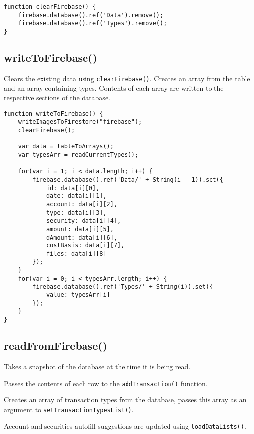 \documentclass[letterpaper]{article}
\begin{document}
\begin{lstlisting}[firstnumber=1]
function clearFirebase() {
    firebase.database().ref('Data').remove();
    firebase.database().ref('Types').remove();
}
\end{lstlisting}

\subsection{writeToFirebase()}

Clears the existing data using \lstinline{clearFirebase()}.
Creates an array from the table and an array containing types.
Contents of each array are written to the respective sections of the database.

\begin{lstlisting}[firstnumber=6]
function writeToFirebase() {
    writeImagesToFirestore("firebase");
    clearFirebase();

    var data = tableToArrays();
    var typesArr = readCurrentTypes();

    for(var i = 1; i < data.length; i++) {
        firebase.database().ref('Data/' + String(i - 1)).set({
            id: data[i][0],
            date: data[i][1],
            account: data[i][2],
            type: data[i][3],
            security: data[i][4],
            amount: data[i][5],
            dAmount: data[i][6],
            costBasis: data[i][7],
            files: data[i][8]
        });
    }
    for(var i = 0; i < typesArr.length; i++) {
        firebase.database().ref('Types/' + String(i)).set({
            value: typesArr[i]
        });
    }
}
\end{lstlisting}

\subsection{readFromFirebase()}

Takes a snapshot of the database at the time it is being read.

Passes the contents of each row to the \lstinline{addTransaction()} function.

Creates an array of transaction types from the database, passes this array as an argument to \lstinline{setTransactionTypesList()}.

Account and securities autofill suggestions are updated using \lstinline{loadDataLists()}.
\end{document}
